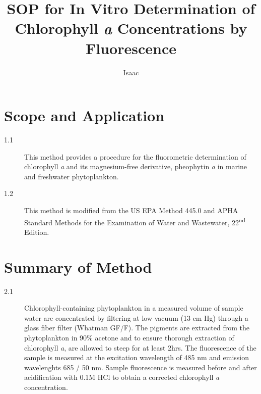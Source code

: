 \documentclass{article}
\author{Isaac}
\title{SOP for In Vitro Determination of Chlorophyll \textit{a} Concentrations by Fluorescence}
\begin{document}

\maketitle

\section{Scope and Application}
\begin{description}
  \item[1.1] This method provides a procedure for the fluorometric determination of chlorophyll \textit{a} and its magnesium-free derivative, pheophytin \textit{a} in marine and freshwater phytoplankton.
  \item[1.2] This method is modified from the US EPA Method 445.0 and APHA Standard Methods for the Examination of Water and Wastewater, 22\textsuperscript{nd} Edition. 
\end{description}

\section{Summary of Method}
\begin{description}
  \item[2.1] Chlorophyll-containing phytoplankton in a measured volume of sample water are concentrated by filtering at low vacuum (13 cm Hg) through a glass fiber filter (Whatman GF/F). The pigments are extracted from the phytoplankton in 90\% acetone and to ensure thorough extraction of chlorophyll \textit{a}, are allowed to steep for at least 2hrs. The fluorescence of the sample is measured at the excitation wavelength of 485 nm and emission wavelenghts 685 / 50 nm. Sample fluorescence is measured before and after acidification with 0.1M HCl to obtain a corrected chlorophyll \textit{a} concentration. 
\end{description}
\end{document}
